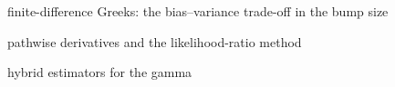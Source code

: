 \begin{planned}
  \item finite-difference Greeks: the bias--variance trade-off in the bump size
  \item pathwise derivatives and the likelihood-ratio method
  \item hybrid estimators for the gamma
\end{planned}
